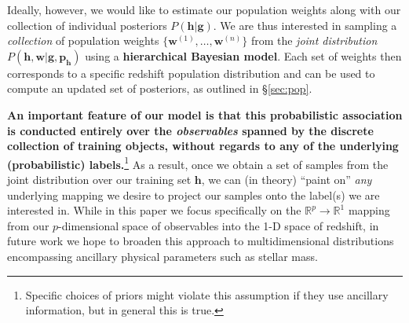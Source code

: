 \documentclass[a4paper,fleqn,usenatbib,english]{mnras}
\begin{document}

Ideally, however, we would like to estimate our population weights along with our collection of individual posteriors $P(\mathbf{h}|\mathbf{g})$. We are thus interested in sampling a \textit{collection} of population weights $\lbrace \mathbf{w}^{(1)},\ldots,\mathbf{w}^{(n)} \rbrace$ from the \textit{joint distribution} $P(\mathbf{h},\mathbf{w}|\mathbf{g},\mathbf{p_h})$ using a \textbf{hierarchical Bayesian model}. Each set of weights then corresponds to a specific redshift population distribution and can be used to compute an updated set of posteriors, as outlined in \S\ref{sec:pop}.


\textbf{An important feature of our model is that this probabilistic association is conducted entirely over the \textit{observables} spanned by the discrete collection of training objects, without regards to any of the underlying (probabilistic) labels.}\footnote{Specific choices of priors might violate this assumption if they use ancillary information, but in general this is true.} As a result, once we obtain a set of samples from the joint distribution over our training set $\mathbf{h}$, we can (in theory) ``paint on'' \textit{any} underlying mapping we desire to project our samples onto the label(s) we are interested in. While in this paper we focus specifically on the $\mathbb{R}^p\rightarrow\mathbb{R}^1$ mapping from our $p$-dimensional space of observables into the 1-D space of redshift, in future work we hope to broaden this approach to multidimensional distributions encompassing ancillary physical parameters such as stellar mass.
\end{document}

